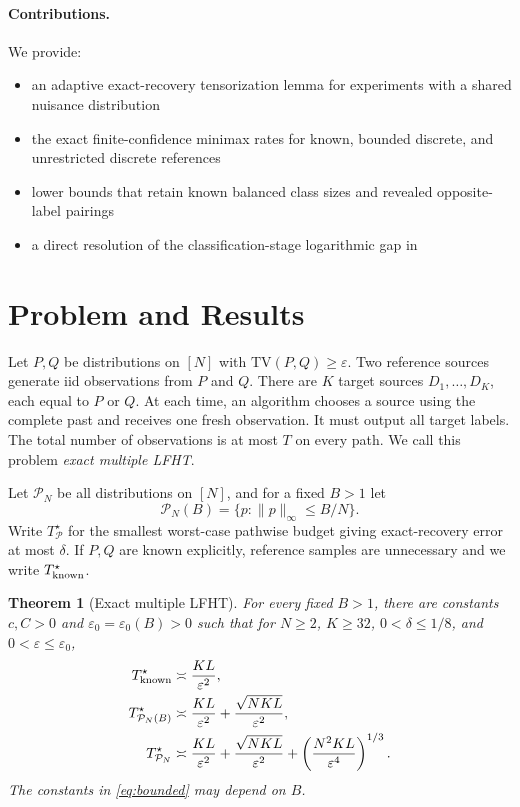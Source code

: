 \documentclass[twoside]{article}
\newtheorem{theorem}{Theorem}
\newcommand{\TV}{\mathrm{TV}}
\newcommand{\cP}{\mathcal P}
\begin{document}
\paragraph{Contributions.} We provide:
\begin{itemize}
\item an adaptive exact-recovery tensorization lemma for experiments with a shared nuisance distribution
\item the exact finite-confidence minimax rates for known, bounded discrete, and unrestricted discrete references
\item lower bounds that retain known balanced class sizes and revealed opposite-label pairings
\item a direct resolution of the classification-stage logarithmic gap in \citet{kumar2026clustering}
\end{itemize}

\section{Problem and Results}

Let $P,Q$ be distributions on $[N]$ with $\TV(P,Q)\geq\varepsilon$. Two reference sources generate iid observations from $P$ and $Q$. There are $K$ target sources $D_1,\ldots,D_K$, each equal to $P$ or $Q$. At each time, an algorithm chooses a source using the complete past and receives one fresh observation. It must output all target labels. The total number of observations is at most $T$ on every path. We call this problem \emph{exact multiple LFHT}.

Let $\cP_N$ be all distributions on $[N]$, and for a fixed $B>1$ let \[ \cP_N(B)=\{p:\|p\|_\infty\leq B/N\}. \] Write $T^\star_{\cP}$ for the smallest worst-case pathwise budget giving exact-recovery error at most $\delta$. If $P,Q$ are known explicitly, reference samples are unnecessary and we write $T^\star_{\rm known}$.

\begin{theorem}[Exact multiple LFHT]
\label{thm:main}
For every fixed $B>1$, there are constants $c,C>0$ and $\varepsilon_0=\varepsilon_0(B)>0$ such that for $N\geq2$, $K\geq32$, $0<\delta\leq1/8$, and $0<\varepsilon\leq\varepsilon_0$,
\begin{align}
T^\star_{\rm known}
&\asymp \frac{KL}{\varepsilon^2},
\label{eq:known}\\
T^\star_{\cP_N(B)}
&\asymp \frac{KL}{\varepsilon^2}
+\frac{\sqrt{NKL}}{\varepsilon^2},
\label{eq:bounded}\\
T^\star_{\cP_N}
&\asymp \frac{KL}{\varepsilon^2}
+\frac{\sqrt{NKL}}{\varepsilon^2}
+\left(\frac{N^2KL}{\varepsilon^4}\right)^{1/3}.
\label{eq:arbitrary}
\end{align}
The constants in \eqref{eq:bounded} may depend on $B$.
\end{theorem}
\end{document}
